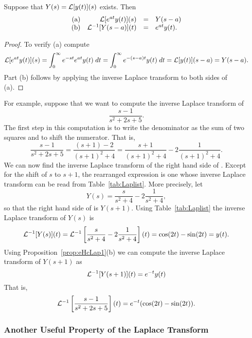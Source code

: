 \documentclass{ximera}
\begin{document}
\begin{prop}  \label{prop:eHcLap1}
Suppose that $Y(s)={\cal L}[y(t)](s)$ exists.  Then
\[
\begin{array}{rrcl}
\mbox{(a)} & {\cal L}[e^{at}y(t)](s) & = & Y(s-a)\\
\mbox{(b)} & {\cal L}^{-1}[Y(s-a)](t) & = & e^{at}y(t).
\end{array}
\]
\end{prop}

\begin{proof}  To verify (a) compute
\[
{\cal L}[e^{at}y(t)](s) = \int_0^{\infty} e^{-st}e^{at} y(t)\; dt
= \int_0^{\infty} e^{-(s-a)t} y(t)\; dt = {\cal L}[y(t)](s-a) = Y(s-a).
\]
Part (b) follows by applying the inverse Laplace transform to both sides 
of (a).  \end{proof}

For example, suppose that we want to compute the inverse Laplace transform of 
\begin{equation}  \label{e:exlappf}
\frac{s-1}{s^2+2s+5}.
\end{equation}
The first step in this computation is to write the denominator as the sum of 
two squares and to shift the numerator.   That is,
\begin{equation}  \label{e:pf1}
\frac{s-1}{s^2+2s+5} = \frac{(s+1)-2}{(s+1)^2+4} = 
\frac{s+1}{(s+1)^2+4} - 2\frac{1}{(s+1)^2+4}.
\end{equation}
We can now find the inverse Laplace transform of the right hand side of 
.  Except for the shift of $s$ to $s+1$, the rearranged expression 
 is one whose inverse Laplace transform can be read from 
Table~\ref{tab:Laplist}.  More precisely, let 
\[
Y(s) = \frac{s}{s^2+4} - 2\frac{1}{s^2+4},
\]
so that the right hand side of  is $Y(s+1)$.  Using 
Table~\ref{tab:Laplist} the inverse Laplace transform of $Y(s)$ is
\begin{equation}  \label{e:exlappf2}
{\cal L}^{-1}[Y(s)](t) = 
{\cal L}^{-1}\left[\frac{s}{s^2+4} - 2\frac{1}{s^2+4}\right](t) = 
\cos(2t) - \sin(2t) = y(t).
\end{equation}
Using Proposition~\ref{prop:eHcLap1}(b) we can compute the inverse Laplace 
transform of $Y(s+1)$ 
as
\[
{\cal L}^{-1}[Y(s+1)](t) = e^{-t}y(t)
\]
That is,
\[
{\cal L}^{-1}\left[\frac{s-1}{s^2+2s+5}\right](t) = e^{-t}(\cos(2t)-\sin(2t)).
\]

\subsubsection*{Another Useful Property of the Laplace Transform}
\end{document}
